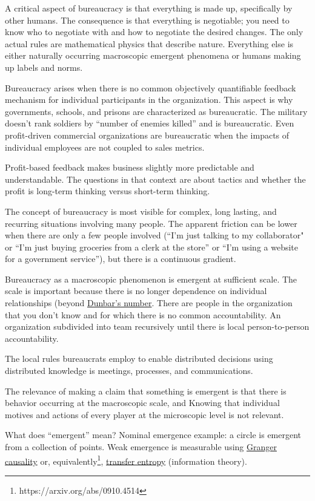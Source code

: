 A critical aspect of bureaucracy is that everything is made up, specifically by other humans. The consequence is that everything is negotiable; you need to know who to negotiate with and how to negotiate the desired changes. The only actual rules are mathematical physics that describe nature. Everything else is either naturally occurring macroscopic emergent phenomena or humans making up labels and norms. 

Bureaucracy arises when there is no common objectively quantifiable feedback mechanism for individual participants in the organization. This aspect is why governments, schools, and prisons are characterized as bureaucratic. The military doesn't rank soldiers by ``number of enemies killed'' and is bureaucratic. Even profit-driven commercial organizations are bureaucratic when the impacts of individual employees are not coupled to sales metrics. 

Profit-based feedback makes business slightly more predictable and understandable. The questions in that context are about tactics and whether the profit is long-term thinking versus short-term thinking. 

The concept of bureaucracy is most visible for complex, long lasting, and recurring situations involving many people. The apparent friction can be lower when there are only a few people involved (``I'm just talking to my collaborator" or ``I'm just buying groceries from a clerk at the store'' or ``I'm using a website for a government service''), but there is a continuous gradient. 

Bureaucracy as a macroscopic phenomenon is emergent at sufficient scale. The scale is important because there is no longer dependence on individual relationships (beyond \href{https://en.wikipedia.org/wiki/Dunbar\%27s_number}{Dunbar's number}. There are people in the organization that you don't know and for which there is no common accountability. An organization subdivided into team recursively until there is local person-to-person accountability.  

The local rules bureaucrats employ to enable distributed decisions using distributed knowledge is meetings, processes, and communications. 

The relevance of making a claim that something is emergent is that there is behavior occurring at the macroscopic scale, and Knowing that individual motives and actions of every player at the microscopic level is not relevant.

What does ``emergent'' mean? Nominal emergence example: a circle is emergent from a collection of points. Weak emergence is measurable using \href{https://en.wikipedia.org/wiki/Granger_causality}{Granger causality} or, equivalently\footnote{https://arxiv.org/abs/0910.4514}, \href{https://en.wikipedia.org/wiki/Transfer_entropy}{transfer entropy} (information theory). 

